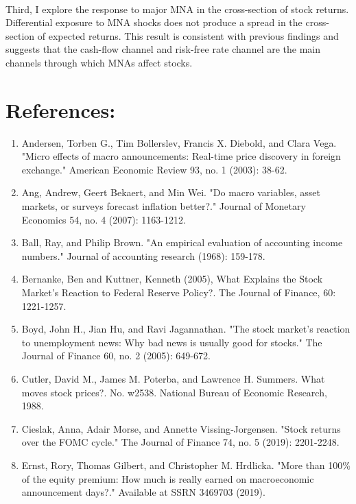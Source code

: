 \documentclass[12pt]{article}
\begin{document}
\paragraph{}
Third, I explore the response to major MNA in the cross-section of stock returns. Differential exposure to MNA shocks does not produce a spread in the cross-section of expected returns. This result is consistent with previous findings and suggests that the cash-flow channel and risk-free rate channel are the main channels through which MNAs affect stocks.



\pagebreak

\section{References:}
\begin{enumerate}
    \item{Andersen, Torben G., Tim Bollerslev, Francis X. Diebold, and Clara Vega. "Micro effects of macro announcements: Real-time price discovery in foreign exchange." American Economic Review 93, no. 1 (2003): 38-62.}
    \item{Ang, Andrew, Geert Bekaert, and Min Wei. "Do macro variables, asset markets, or surveys forecast inflation better?." Journal of Monetary Economics 54, no. 4 (2007): 1163-1212.}
    \item{Ball, Ray, and Philip Brown. "An empirical evaluation of accounting income numbers." Journal of accounting research (1968): 159-178.}
    \item{Bernanke, Ben and Kuttner, Kenneth (2005), What Explains the Stock Market's Reaction to Federal Reserve Policy?. The Journal of Finance, 60: 1221-1257.}
    \item{Boyd, John H., Jian Hu, and Ravi Jagannathan. "The stock market's reaction to unemployment news: Why bad news is usually good for stocks." The Journal of Finance 60, no. 2 (2005): 649-672.}
    \item{Cutler, David M., James M. Poterba, and Lawrence H. Summers. What moves stock prices?. No. w2538. National Bureau of Economic Research, 1988.}
    \item{Cieslak, Anna, Adair Morse, and Annette Vissing‐Jorgensen. "Stock returns over the FOMC cycle." The Journal of Finance 74, no. 5 (2019): 2201-2248.}
    \item{Ernst, Rory, Thomas Gilbert, and Christopher M. Hrdlicka. "More than 100\% of the equity premium: How much is really earned on macroeconomic announcement days?." Available at SSRN 3469703 (2019).}

\end{enumerate}
\end{document}
